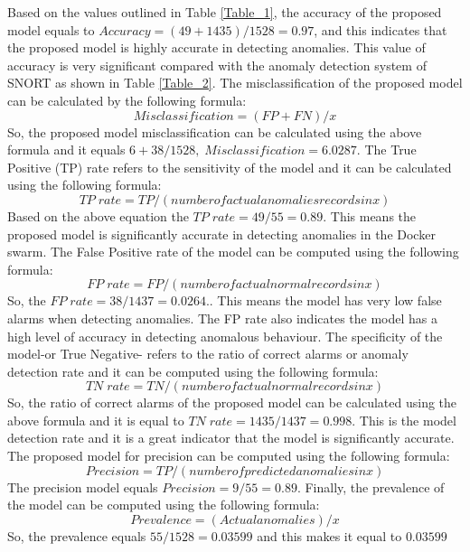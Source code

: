 \documentclass[sigconf]{acmart}
\begin{document}
Based on the values outlined in Table \ref{Table_1}, the accuracy of the proposed model equals to $Accuracy=  (49 +1435)/1528=0.97$, and this indicates that the proposed model is highly accurate in detecting anomalies. This value of accuracy is very significant compared with the anomaly detection system of SNORT as shown in Table \ref{Table_2}. The misclassification of the proposed model can be calculated by the following formula: 
\[ Misclassification =  (FP+FN )/x \] So, the proposed model misclassification can be calculated using the above formula and it equals $6 + 38/1528, \; Misclassification = 6.0287$.
The True Positive (TP) rate refers to the sensitivity of the model and it can be calculated using the following formula:
\[TP \;  rate=  TP/(number of actual anomalies records in x)\]
Based on the above equation the $TP \; rate = 49/55 = 0.89$. This means the proposed model is significantly accurate in detecting anomalies in the Docker swarm. The False Positive rate of the model can be computed using the following formula: 
\[FP \;  rate =FP/(number of actual normal records in x)\]
So, the $FP \; rate = 38/1437=0.0264.$. This means the model has very low false alarms when detecting anomalies. The FP rate also indicates the model has a high level of accuracy in detecting anomalous behaviour. The specificity of the model-or True Negative- refers to the ratio of correct alarms or anomaly detection rate and it can be computed using the following formula: 
\[TN \; rate=TN/(number of actual normal records in x)\]
So, the ratio of correct alarms of the proposed model can be calculated using the above formula and it is equal to $TN \;  rate=1435/1437=0.998$. This is the model detection rate and it is a great indicator that the model is significantly accurate. The proposed model for precision can be computed using the following formula: 
\[Precision=  TP/(number of predicted anomalies in x)\]
The precision model equals $Precision=9/55=0.89$. Finally, the prevalence of the model can be computed using the following formula: 
\[Prevalence=(Actual anomalies)/x\]
So, the prevalence equals $55/1528=0.03599$ and this makes it equal to $0.03599$
\end{document}
